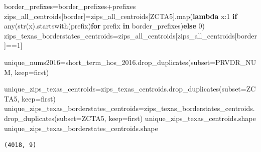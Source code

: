 \documentclass[
  letterpaper,
  DIV=11,
  numbers=noendperiod]{scrartcl}
\newenvironment{Shaded}{\begin{snugshade}}{\end{snugshade}}
\newcommand{\BuiltInTok}[1]{\textcolor[rgb]{0.00,0.23,0.31}{#1}}
\newcommand{\ControlFlowTok}[1]{\textcolor[rgb]{0.00,0.23,0.31}{\textbf{#1}}}
\newcommand{\DecValTok}[1]{\textcolor[rgb]{0.68,0.00,0.00}{#1}}
\newcommand{\KeywordTok}[1]{\textcolor[rgb]{0.00,0.23,0.31}{\textbf{#1}}}
\newcommand{\NormalTok}[1]{\textcolor[rgb]{0.00,0.23,0.31}{#1}}
\newcommand{\OperatorTok}[1]{\textcolor[rgb]{0.37,0.37,0.37}{#1}}
\newcommand{\StringTok}[1]{\textcolor[rgb]{0.13,0.47,0.30}{#1}}
\begin{document}
\begin{Shaded}
\begin{Highlighting}[]
\NormalTok{border\_prefixes}\OperatorTok{=}\NormalTok{border\_prefixes}\OperatorTok{+}\NormalTok{prefixes}
\NormalTok{zips\_all\_centroids[}\StringTok{\textquotesingle{}border\textquotesingle{}}\NormalTok{]}\OperatorTok{=}\NormalTok{zips\_all\_centroids[}\StringTok{\textquotesingle{}ZCTA5\textquotesingle{}}\NormalTok{].}\BuiltInTok{map}\NormalTok{(}\KeywordTok{lambda}\NormalTok{ x:}\DecValTok{1} \ControlFlowTok{if} \BuiltInTok{any}\NormalTok{(}\BuiltInTok{str}\NormalTok{(x).startswith(prefix)}\ControlFlowTok{for}\NormalTok{ prefix }\KeywordTok{in}\NormalTok{ border\_prefixes)}\ControlFlowTok{else} \DecValTok{0}\NormalTok{)}
\NormalTok{zips\_texas\_borderstates\_centroids}\OperatorTok{=}\NormalTok{zips\_all\_centroids[zips\_all\_centroids[}\StringTok{\textquotesingle{}border\textquotesingle{}}\NormalTok{]}\OperatorTok{==}\DecValTok{1}\NormalTok{]}
\end{Highlighting}
\end{Shaded}

\begin{Shaded}
\begin{Highlighting}[]
\NormalTok{unique\_nums2016}\OperatorTok{=}\NormalTok{short\_term\_hos\_2016.drop\_duplicates(subset}\OperatorTok{=}\StringTok{\textquotesingle{}PRVDR\_NUM\textquotesingle{}}\NormalTok{, keep}\OperatorTok{=}\StringTok{\textquotesingle{}first\textquotesingle{}}\NormalTok{)}
\end{Highlighting}
\end{Shaded}

\begin{Shaded}
\begin{Highlighting}[]
\NormalTok{unique\_zips\_texas\_centroids}\OperatorTok{=}\NormalTok{zips\_texas\_centroids.drop\_duplicates(subset}\OperatorTok{=}\StringTok{\textquotesingle{}ZCTA5\textquotesingle{}}\NormalTok{, keep}\OperatorTok{=}\StringTok{\textquotesingle{}first\textquotesingle{}}\NormalTok{)}
\NormalTok{unique\_zips\_texas\_borderstates\_centroids}\OperatorTok{=}\NormalTok{zips\_texas\_borderstates\_centroids.drop\_duplicates(subset}\OperatorTok{=}\StringTok{\textquotesingle{}ZCTA5\textquotesingle{}}\NormalTok{, keep}\OperatorTok{=}\StringTok{\textquotesingle{}first\textquotesingle{}}\NormalTok{)}
\NormalTok{unique\_zips\_texas\_centroids.shape}
\NormalTok{unique\_zips\_texas\_borderstates\_centroids.shape}
\end{Highlighting}
\end{Shaded}

\begin{verbatim}
(4018, 9)
\end{verbatim}
\end{document}
